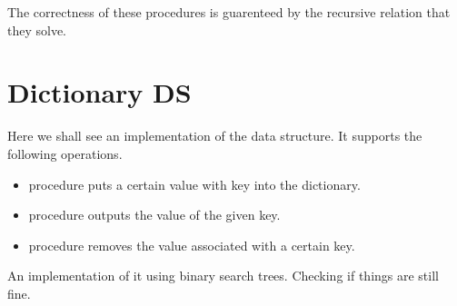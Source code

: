 \documentclass{myclass}
\begin{document}
The correctness of these procedures is guarenteed by the recursive relation that they solve.

\section*{Dictionary DS}

Here we shall see an implementation of the  data structure. It supports the 
following operations.

\begin{itemize}
    \item {} procedure puts a certain value with key into the dictionary.
    \item {} procedure outputs the value of the given key.
    \item {} procedure removes the value associated with a certain key.
\end{itemize}

An implementation of it using binary search trees.
Checking if things are still fine.
\end{document}
